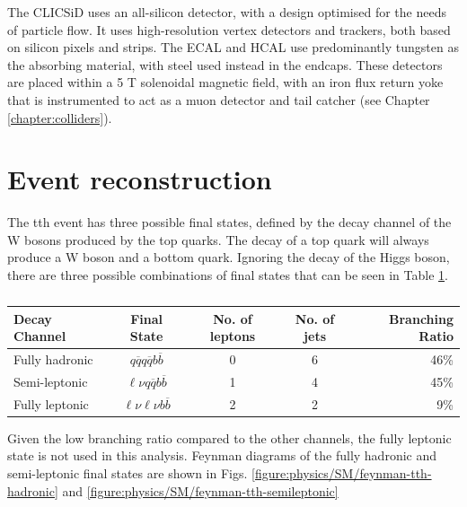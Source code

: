 The CLIC\textunderscore SiD uses an all-silicon detector, with a design optimised for the needs of particle flow. It uses high-resolution vertex detectors and trackers, both based on silicon pixels and strips. The \acrshort{ECAL} and \acrshort{HCAL} use predominantly tungsten as the absorbing material, with steel used instead in the endcaps. These detectors are placed within a 5 T solenoidal magnetic field, with an iron flux return yoke that is instrumented to act as a muon detector and tail catcher (see Chapter \ref{chapter:colliders}).

\section{Event reconstruction}
The tth event has three possible final states, defined by the decay channel of the W bosons produced by the top quarks. The decay of a top quark will always produce a W boson and a bottom quark. Ignoring the decay of the Higgs boson, there are three possible combinations of final states that can be seen in Table \ref{table:physics/final-states}. \\

\begin{table}[h]
\centering
	\begin{tabular}{ l c c c r }
	\hline \hline
	Decay Channel & Final State & No. of leptons & No. of jets & Branching Ratio \\ \hline
	Fully hadronic & $q\overline{q}q\overline{q}b\overline{b}$ & 0 & 6 & 46\% \\
	Semi-leptonic &  $\ell \nu q\overline{q}b\overline{b}$ & 1 & 4 & 45\% \\
	Fully leptonic & $\ell \nu \ell \nu b\overline{b}$ & 2 & 2 & 9\% \\ \hline \hline
	\end{tabular}
	\caption{ }
	\label{table:physics/final-states}
\end{table}

Given the low branching ratio compared to the other channels, the fully leptonic state is not used in this analysis. Feynman diagrams of the fully hadronic and semi-leptonic final states are shown in Figs. \ref{figure:physics/SM/feynman-tth-hadronic} and \ref{figure:physics/SM/feynman-tth-semileptonic}

